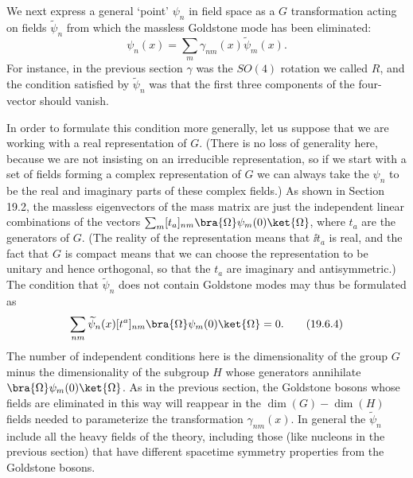We next express a general `point' $\psi_n$ in field space as a $G$ transformation acting on fields $\widetilde\psi_n$ from which the massless Goldstone mode has been eliminated:
\begin{equation}
\psi_n(x)=\sum_m\gamma_{nm}(x)\widetilde\psi_m(x).
\tag{19.6.3}\label{eq:19.6.3}
\end{equation}
For instance, in the previous section $\gamma$ was the $SO(4)$ rotation we called $R$, and the condition satisfied by $\widetilde\psi_n$ was that the first three components of the four-vector should vanish.

In order to formulate this condition more generally, let us suppose that we are working with a real representation of $G$. (There is no loss of generality here, because we are not insisting on an irreducible representation, so if we start with a set of fields forming a complex representation of $G$ we can always take the $\psi_n$ to be the real and imaginary parts of these complex fields.) As shown in Section 19.2, the massless eigenvectors of the mass matrix are just the independent linear combinations of the vectors $\sum_m[t_a]_{nm}\bra{\Omega}\psi_m(0)\ket{\Omega}$, where $t_a$ are the generators of $G$. (The reality of the representation means that $\ii t_a$ is real, and the fact that $G$ is compact means that we can choose the representation to be unitary and hence orthogonal, so that the $t_a$ are imaginary and antisymmetric.) The condition that $\widetilde\psi_n$ does not contain Goldstone modes may thus be formulated as
\begin{equation}
\sum_{nm}\widetilde\psi_n(x)[t^a]_{nm}
\bra{\Omega}\psi_m(0)\ket{\Omega}=0.
\tag{19.6.4}\label{eq:19.6.4}
\end{equation}
The number of independent conditions here is the dimensionality of the group $G$ minus the dimensionality of the subgroup $H$ whose generators annihilate $\bra{\Omega}\psi_m(0)\ket{\Omega}$. As in the previous section, the Goldstone bosons whose fields are eliminated in this way will reappear in the $\dim(G)-\dim(H)$ fields needed to parameterize the transformation $\gamma_{nm}(x)$. In general the $\widetilde\psi_n$ include all the heavy fields of the theory, including those (like nucleons in the previous section) that have different spacetime symmetry properties from the Goldstone bosons.

